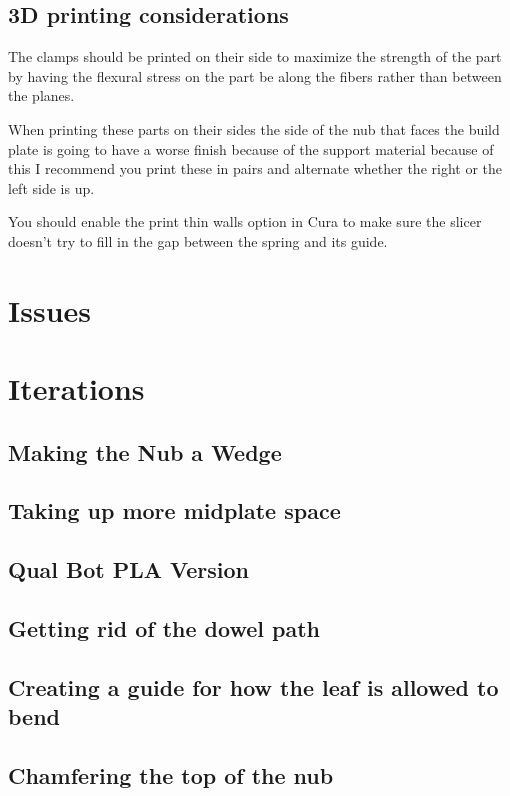 \documentclass{iopart}
\begin{document}
\subsection{3D printing considerations}
The clamps should be printed on their side to maximize the strength of the part by having the flexural stress on the part be along the fibers rather than between the planes.

When printing these parts on their sides the side of the nub that faces the build plate is going to have a worse finish because of the support material because of this I recommend you print these in pairs and alternate whether the right or the left side is up.

You should enable the print thin walls option in Cura to make sure the slicer doesn't try to fill in the gap between the spring and its guide.
\section{Issues}

\section{Iterations}
\subsection{Making the Nub a Wedge}
\subsection{Taking up more midplate space}
\subsection{Qual Bot PLA Version}
\subsection{Getting rid of the dowel path}
\subsection{Creating a guide for how the leaf is allowed to bend}
\subsection{Chamfering the top of the nub}
\end{document}
